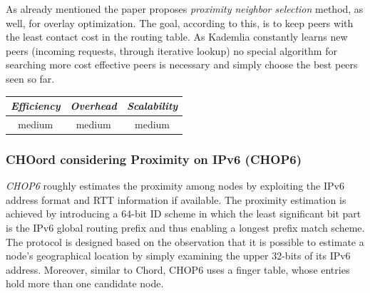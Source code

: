 As already mentioned the paper proposes \emph{proximity neighbor selection}
method, as well, for overlay optimization. The goal, according to this, is to
keep peers with the least contact cost in the routing table. As Kademlia
constantly learns new peers (incoming requests, through iterative lookup) no
special algorithm for searching more cost effective peers is necessary and
simply choose the best peers seen so far.

\begin{center}
\begin{tabular}{ccc}
\emph{Efficiency} & \emph{Overhead} & \emph{Scalability} \\
\hline
medium &
% 
medium &
%
medium
\end{tabular}
\end{center}

\subsubsection{CHOord considering Proximity on IPv6 (CHOP6)}
\emph{CHOP6} \cite{MT2007} roughly estimates the proximity among
nodes by exploiting the IPv6 address format and RTT information if available.
The proximity estimation is achieved by introducing a 64-bit ID scheme in which
the least significant bit part is the IPv6 global routing prefix and thus
enabling a longest prefix match scheme. The protocol is designed based on the
observation that it is possible to estimate a node's geographical location by
simply examining the upper 32-bits of its IPv6 address. Moreover, similar to
Chord\cite{stoica_chord_2001}, CHOP6 uses a finger table, whose entries hold
more than one candidate node.

%
%

